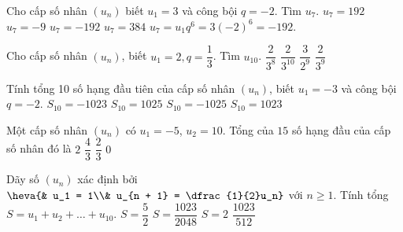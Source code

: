\begin{ex}
	Cho cấp số nhân $(u_n)$ biết $u_1=3$ và công bội $q=-2$. Tìm $u_7$.
	\choice
	{\True $u_7=192$}
	{$u_7=-9$}
	{$u_7=-192$}
	{$u_7=384$}
	\loigiai
	{
		$u_7=u_1q^6=3(-2)^6=-192$.
	}
\end{ex}

\begin{ex}
	Cho cấp số nhân $\left({u_n}\right)$, biết $u_1=2,q=\dfrac{1}{3}$. Tìm $u_{10}$.
	\choice
	{$\dfrac{2}{3^8}$}
	{$\dfrac{2}{3^{10}}$}
	{$\dfrac{3}{2^9}$}
	{\True $\dfrac{2}{3^9}$}
\end{ex}


\begin{ex}%
	Tính tổng 10 số hạng đầu tiên của cấp số nhân $(u_n)$, biết $u_1=-3$ và công bội $q=-2$.
	\choice
	{$S_{10}=-1023$}
	{$S_{10}=1025$}
	{$S_{10}=-1025$}
	{\True $S_{10}=1023$}
\end{ex}

\begin{ex}%
	Một cấp số nhân $(u_n)$ có $u_1=-5$, $u_2=10$. Tổng của $15$ số hạng đầu của cấp số nhân đó là
	\choice
	{\True $2$}
	{$\dfrac{4}{3}$}
	{$\dfrac{2}{3}$}
	{$0$}
\end{ex}

\begin{ex}%
	Dãy số $\left(u_n\right)$ xác định bởi $\heva{&
		u_1 = 1\\&
		u_{n + 1} = \dfrac{1}{2}u_n}$ với $n \ge 1$. Tính tổng $S = u_1 + u_2 +\ldots + u_{10}$.
	\choice
	{$S = \dfrac{5}{2}$}
	{$S = \dfrac {1023} {2048}$}
	{$S = 2$}
	{\True $\dfrac {1023} {512}$}
\end{ex}

